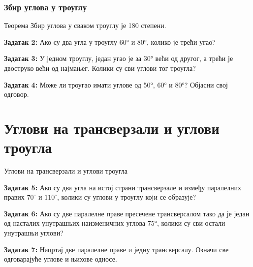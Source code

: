 \documentclass[12pt]{beamer}
\begin{document}
\begin{frame}\frametitle{Збир углова у троуглу}

\begin{block}{Теорема}
Збир углова у сваком троуглу је 180 степени.
\end{block}

\textbf{Задатак 2:}
Ако су два угла у троуглу 60° и 80°, колико је трећи угао?


\textbf{Задатак 3:}
У једном троуглу, један угао је за 30° већи од другог, а трећи је двоструко већи од најмањег. Колики су сви углови тог троугла?

\textbf{Задатак 4:}
Може ли троугао имати углове од 50°, 60° и 80°? Објасни свој одговор.

\end{frame}


\section{Углови на трансверзали и углови троугла}
\begin{frame}{Углови на трансверзали и углови троугла}
\begin{tikzpicture}
\end{tikzpicture}

\textbf{Задатак 5:}
Ако су два угла на истој страни трансверзале и између паралелних правих $70^\circ$ и $110^\circ$, колики су углови у троуглу који се образује?

\textbf{Задатак 6:}
Ако су две паралелне праве пресечене трансверсалом тако да је један од насталих унутрашњих наизменичних углова 75°, колики су сви остали унутрашњи углови?

\textbf{Задатак 7:}
Нацртај две паралелне праве и једну трансверсалу. Означи све одговарајуће углове и њихове односе.

\end{frame}
\end{document}
